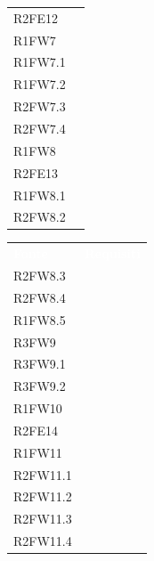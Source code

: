 \begin{table}[!htbp]
\begin{tabular}[t]{ m{}<{\centering}  m{}<{\centering} }
	R2FE12 & \Ns \\			
	 
	R1FW7 & \So \\	
	
	R1FW7.1 & \So \\

	R1FW7.2 & \So \\
	
	R2FW7.3 & \So \\
	
	R2FW7.4 & \So \\		
	
	R1FW8 & \Ns \\		
	
	R2FE13 & \Ns \\	
	 
	R1FW8.1 & \Ns \\	
	
	R2FW8.2 & \Ns \\

\end{tabular}
\begin{tabular}[t]{ m{}<{\centering}  m{}<{\centering} }
	\rowcolor{darkblue}
	\textcolor{white}{\textbf{Fonte}} &\textcolor{white}{\textbf{Requisiti}}\\ 	
	 
	R2FW8.3 & \Ns \\	
	 
	R2FW8.4 & \Ns \\	 
	 
	R1FW8.5 & \Ns \\	 
	 
	R3FW9 & \Ns \\	
	 
	R3FW9.1& \Ns \\	 
	 
	R3FW9.2& \Ns \\	  
	 
	R1FW10 & \So \\	 
	 
	R2FE14& \So \\	 
	 	 
	R1FW11& \So \\	 	
	
	R2FW11.1 & \So \\
 	
	R2FW11.2 & \So \\
 	
	R2FW11.3 & \So \\
 
	R2FW11.4 & \Ns \\
	

\end{tabular}
\end{table}
